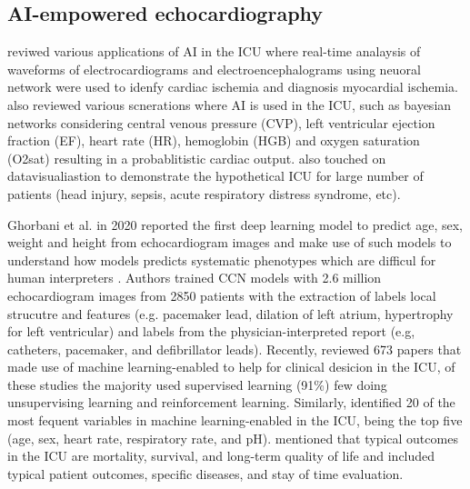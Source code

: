 

\subsection{AI-empowered echocardiography}

\cite{hanson2001} reviwed various applications of AI in the ICU where real-time analaysis of waveforms of electrocardiograms and electroencephalograms using neuoral network were used to idenfy cardiac ischemia and diagnosis myocardial ischemia. 
\cite{hanson2001} also reviewed various scnerations where AI is used in the ICU, such as bayesian networks considering central venous pressure (CVP), left ventricular ejection fraction (EF), heart rate (HR), hemoglobin (HGB) and oxygen saturation (O2sat) resulting in a probablitistic cardiac output.
\cite{hanson2001} also touched on datavisualiastion to demonstrate the hypothetical ICU for large number of patients (head injury, sepsis, acute respiratory distress syndrome, etc).

Ghorbani et al. in 2020 reported the first deep learning model to predict age, sex, weight and height from echocardiogram images and make use of such models to understand how models predicts systematic phenotypes which are difficul for human interpreters \cite{Ghorbani-DigitalMedicineNature-JAN2020}.
Authors trained CCN models with 2.6 million echocardiogram images from 2850 patients with the extraction of labels local strucutre and features (e.g. pacemaker lead, dilation of left atrium, hypertrophy for left ventricular) and labels from the physician-interpreted report (e.g, catheters, pacemaker, and deﬁbrillator leads). 
Recently, \cite{hong2022} reviewed 673 papers that made use of machine learning-enabled to help for clinical desicion in the ICU, of these studies the majority used supervised learning (91\%) few doing unsupervising learning and reinforcement learning.
Similarly, \cite{hong2022} identified 20 of the most fequent variables in machine learning-enabled in the ICU, being the top five (age, sex, heart rate, respiratory rate, and pH).
\cite{hong2022} mentioned that typical outcomes in the ICU are mortality, survival, and long-term quality of life and included typical patient outcomes, specific diseases, and stay of time evaluation. 

